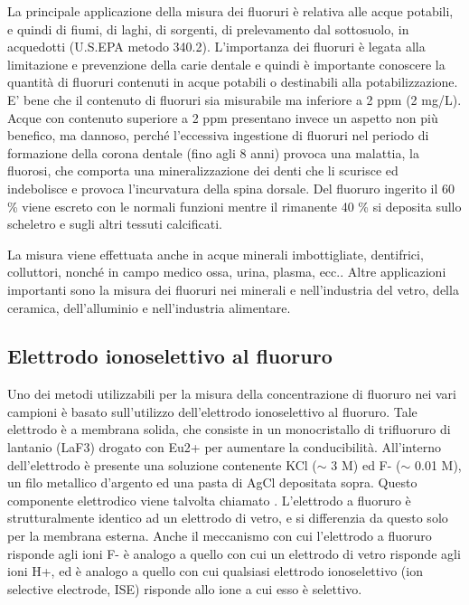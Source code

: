 La principale applicazione della misura dei fluoruri è relativa alle acque potabili, e quindi di fiumi, di laghi, di sorgenti, di prelevamento dal sottosuolo, in acquedotti (U.S.EPA metodo 340.2). L'importanza dei fluoruri è legata alla limitazione e prevenzione della carie dentale e quindi è importante conoscere la quantità di fluoruri contenuti in acque potabili o destinabili alla potabilizzazione. E' bene che il contenuto di fluoruri sia misurabile ma inferiore a 2 ppm (2 mg/L). Acque con contenuto superiore a 2 ppm presentano invece un aspetto non più benefico, ma dannoso, perché l'eccessiva ingestione di fluoruri nel periodo di formazione della corona dentale (fino agli 8 anni) provoca una malattia, la fluorosi, che comporta una mineralizzazione dei denti che li scurisce ed indebolisce e provoca l'incurvatura della spina dorsale. Del fluoruro ingerito il 60 \% viene escreto con le normali funzioni mentre il rimanente 40 \% si deposita sullo scheletro e sugli altri tessuti calcificati.

La misura viene effettuata anche in acque minerali imbottigliate, dentifrici, colluttori, nonché in campo medico ossa, urina, plasma, ecc.. Altre applicazioni importanti sono la misura dei fluoruri nei minerali e nell'industria del vetro, della ceramica, dell'alluminio e nell'industria alimentare.

\subsection{Elettrodo ionoselettivo al fluoruro}

Uno dei metodi utilizzabili per la misura della concentrazione di fluoruro nei vari campioni è basato sull'utilizzo dell'elettrodo ionoselettivo al fluoruro. Tale elettrodo è a membrana solida, che consiste in un monocristallo di trifluoruro di lantanio (LaF3) drogato con Eu2+ per aumentare la conducibilità. All'interno dell'elettrodo è presente una soluzione contenente KCl ($\sim$ 3 M) ed F- ($\sim$ 0.01 M), un filo metallico d'argento ed una pasta di AgCl depositata sopra. Questo componente elettrodico viene talvolta chiamato . L'elettrodo a fluoruro è strutturalmente identico ad un elettrodo di vetro, e si differenzia da questo solo per la membrana esterna. Anche il meccanismo con cui l'elettrodo a fluoruro risponde agli ioni F- è analogo a quello con cui un elettrodo di vetro risponde agli ioni H+, ed è analogo a quello con cui qualsiasi elettrodo ionoselettivo (ion selective electrode, ISE) risponde allo ione a cui esso è selettivo.

